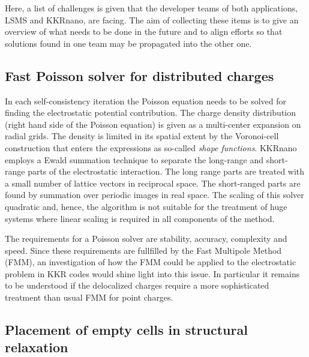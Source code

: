 \documentclass{llncs}
\def\KKRnano{{KKRnano}}
\def\LSMS{{LSMS}}
\begin{document}
Here, a list of challenges is given that the developer teams of both applications, \LSMS{} and \KKRnano{}, are
facing. The aim of collecting these items is to give an overview of what needs to be done in the future
and to align efforts so that solutions found in one team may be propagated into the other one.

\subsection{Fast Poisson solver for distributed charges} %
In each self-consistency iteration the Poisson equation needs to be solved for finding the
electrostatic potential contribution. The charge density distribution (right hand side of the Poisson equation)
is given as a multi-center expansion on radial grids. The density is limited in its spatial extent
by the Voronoi-cell construction that enters the expressions as so-called \emph{shape functions}.
\KKRnano{} employs a Ewald summation technique to separate the long-range and short-range parts of the electrostatic interaction.
The long range parts are treated with a small number of lattice vectors in reciprocal space. The short-ranged parts
are found by summation over periodic images in real space.
The scaling of this solver quadratic  and, hence, the algorithm is not suitable
for the treatment of huge systems where linear scaling is required in all components of the method.

The requirements for a Poisson solver are stability, accuracy, complexity and speed.
Since these requirements are fullfilled by the Fast Multipole Method (FMM), 
an investigation of how the FMM could be applied to the
electrostatic problem in KKR codes would shine light into this issue.
In particular it remains to be understood if the delocalized charges require a more
sophisticated treatment than usual FMM for point charges.

\subsection{Placement of empty cells in structural relaxation} %
\end{document}
